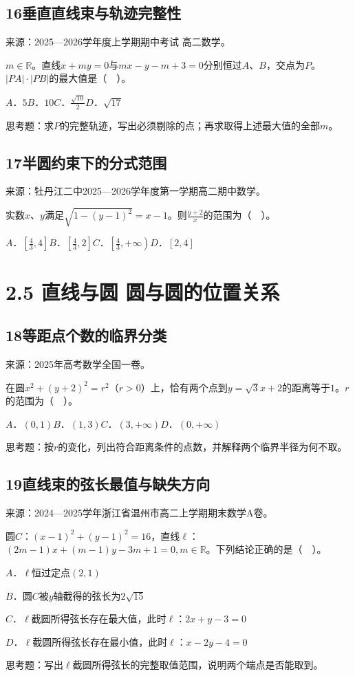 \documentclass[UTF8,11pt,a4paper,fontset=windows]{ctexart}
\newcommand{\qhead}[2]{\subsection{#1\texorpdfstring{\quad}{ }#2}}
\newcommand{\qsource}[1]{{\footnotesize 来源：#1。\par}}
\begin{document}
\qhead{16}{垂直直线束与轨迹完整性}
\qsource{2025—2026学年度上学期期中考试 高二数学}
\(m\in \mathbb{R} \)。直线\(x+ my= 0\)与\(mx- y- m+ 3= 0\)分别恒过\(A\)、\(B\)，交点为\(P\)。\(\lvert PA\rvert \cdot \lvert PB\rvert \)的最大值是（　）。\par
\(A\)．\(5\)\qquad \(B\)．\(10\)\qquad \(C\)．\(\frac{\sqrt{10}}{2}\)\qquad \(D\)．\(\sqrt{17}\)\par
思考题：求\(P\)的完整轨迹，写出必须剔除的点；再求取得上述最大值的全部\(m\)。\par
\vspace{12mm}\vfill

\qhead{17}{半圆约束下的分式范围}
\qsource{牡丹江二中2025—2026学年度第一学期高二期中数学}
实数\(x\)、\(y\)满足\(\sqrt{1- \left(y- 1\right)^{2}}= x- 1\)。则\(\frac{y+ 2}{x}\)的范围为（　）。\par
\(A\)．\(\left[\frac{4}{3},\allowbreak 4\right]\)\qquad \(B\)．\(\left[\frac{4}{3},\allowbreak 2\right]\)\qquad \(C\)．\(\left[\frac{4}{3},\allowbreak + \infty \right)\)\qquad \(D\)．\(\left[2,\allowbreak 4\right]\)\par
\vspace{12mm}\vfill

\mbox{}

\clearpage

\section{2.5 直线与圆 圆与圆的位置关系}

\qhead{18}{等距点个数的临界分类}
\qsource{2025年高考数学全国一卷}
在圆\(x^{2}+ \left(y+ 2\right)^{2}= r^{2}\)（\(r> 0\)）上，恰有两个点到\(y= \sqrt{3}x+ 2\)的距离等于\(1\)。\(r\)的范围为（　）。\par
\(A\)．\(\left(0,\allowbreak 1\right)\)\qquad \(B\)．\(\left(1,\allowbreak 3\right)\)\qquad \(C\)．\(\left(3,\allowbreak + \infty \right)\)\qquad \(D\)．\(\left(0,\allowbreak + \infty \right)\)\par
思考题：按\(r\)的变化，列出符合距离条件的点数，并解释两个临界半径为何不取。\par
\vspace{12mm}\vfill

\qhead{19}{直线束的弦长最值与缺失方向}
\qsource{2024—2025学年浙江省温州市高二上学期期末数学A卷}
圆\(C\)：\(\left(x- 1\right)^{2}+ \left(y- 1\right)^{2}= 16\)，直线\(\ell \)：\(\left(2m- 1\right)x+ \left(m- 1\right)y- 3m+ 1= 0,\allowbreak m\in \mathbb{R} \)。下列结论正确的是（　）。\par
\(A\)．\(\ell \)恒过定点\(\left(2,\allowbreak 1\right)\)\par
\(B\)．圆\(C\)被\(y\)轴截得的弦长为\(2\sqrt{15}\)\par
\(C\)．\(\ell \)截圆所得弦长存在最大值，此时\(\ell \)：\(2x+ y- 3= 0\)\par
\(D\)．\(\ell \)截圆所得弦长存在最小值，此时\(\ell \)：\(x- 2y- 4= 0\)\par
思考题：写出\(\ell \)截圆所得弦长的完整取值范围，说明两个端点是否能取到。\par
\vspace{12mm}\vfill
\end{document}
